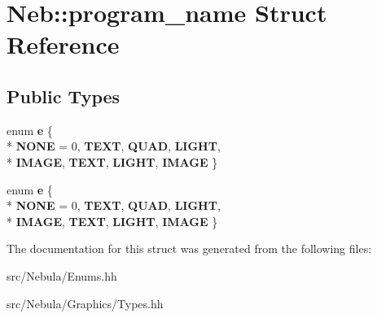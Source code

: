 \hypertarget{structNeb_1_1program__name}{\section{Neb\-:\-:program\-\_\-name Struct Reference}
\label{structNeb_1_1program__name}
}
\subsection*{Public Types}
\begin{DoxyCompactItemize}
\item 
enum {\bfseries e} \{ \\*
{\bfseries N\-O\-N\-E} = 0, 
{\bfseries T\-E\-X\-T}, 
{\bfseries Q\-U\-A\-D}, 
{\bfseries L\-I\-G\-H\-T}, 
\\*
{\bfseries I\-M\-A\-G\-E}, 
{\bfseries T\-E\-X\-T}, 
{\bfseries L\-I\-G\-H\-T}, 
{\bfseries I\-M\-A\-G\-E}
 \}
\item 
enum {\bfseries e} \{ \\*
{\bfseries N\-O\-N\-E} = 0, 
{\bfseries T\-E\-X\-T}, 
{\bfseries Q\-U\-A\-D}, 
{\bfseries L\-I\-G\-H\-T}, 
\\*
{\bfseries I\-M\-A\-G\-E}, 
{\bfseries T\-E\-X\-T}, 
{\bfseries L\-I\-G\-H\-T}, 
{\bfseries I\-M\-A\-G\-E}
 \}
\end{DoxyCompactItemize}


The documentation for this struct was generated from the following files\-:\begin{DoxyCompactItemize}
\item 
src/\-Nebula/Enums.\-hh\item 
src/\-Nebula/\-Graphics/Types.\-hh\end{DoxyCompactItemize}
